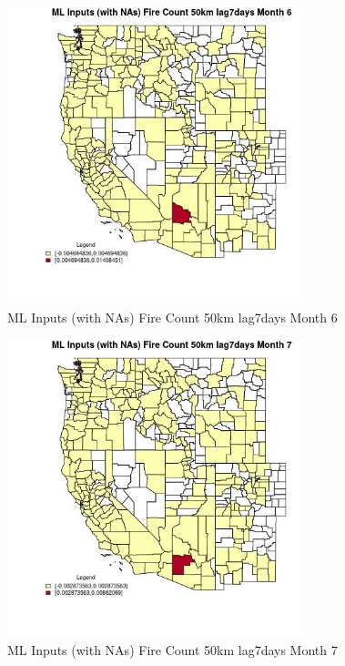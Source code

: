 \begin{figure} 
\centering  
\includegraphics[width=0.77\textwidth]{Code_Outputs/Report_ML_input_PM25_Step4_part_e_de_duplicated_aves_compiled_2019-05-21wNAs_CountyFire_Count_50km_lag7daysmedianMonth6.jpg} 
\caption{\label{fig:Report_ML_input_PM25_Step4_part_e_de_duplicated_aves_compiled_2019-05-21wNAsCountyFire_Count_50km_lag7daysmedianMonth6}ML Inputs (with NAs) Fire Count 50km lag7days Month 6} 
\end{figure} 
 

\begin{figure} 
\centering  
\includegraphics[width=0.77\textwidth]{Code_Outputs/Report_ML_input_PM25_Step4_part_e_de_duplicated_aves_compiled_2019-05-21wNAs_CountyFire_Count_50km_lag7daysmedianMonth7.jpg} 
\caption{\label{fig:Report_ML_input_PM25_Step4_part_e_de_duplicated_aves_compiled_2019-05-21wNAsCountyFire_Count_50km_lag7daysmedianMonth7}ML Inputs (with NAs) Fire Count 50km lag7days Month 7} 
\end{figure} 
 

